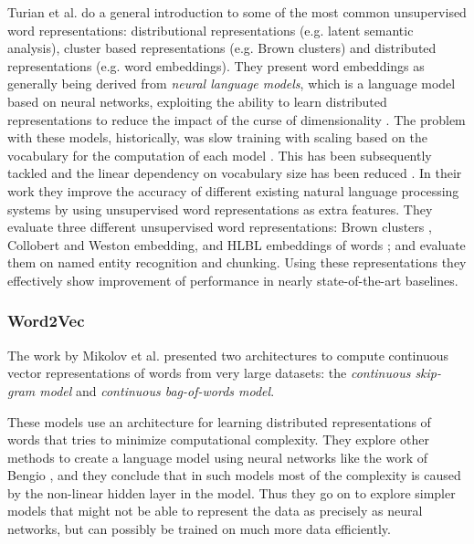 Turian et al. \cite{Turian:2010:WRS:1858681.1858721} do a general introduction
to some of the most common unsupervised word representations: distributional
representations (e.g. latent semantic analysis), cluster based representations
(e.g. Brown clusters) and distributed representations (e.g. word embeddings).
They present word embeddings as generally being derived from {\em neural
language models}, which is a language model based on neural networks,
exploiting the ability to learn distributed representations to reduce the
impact of the curse of dimensionality \cite{Bengio:2008}. The problem with
these models, historically, was slow training with scaling based on the
vocabulary for the computation of each model
\cite{Bengio:2003:NPL:944919.944966}. This has been subsequently tackled and
the linear dependency on vocabulary size has been reduced
\cite{Morin+al-2005,Collobert:2008:UAN:1390156.1390177,NIPS2008_3583}. In their
work they improve the accuracy of different existing natural language
processing systems by using unsupervised word representations as extra
features. They evaluate three different unsupervised word representations:
Brown clusters \cite{Brown:1992:CNG:176313.176316}, Collobert and Weston
\cite{Weston2008} embedding, and HLBL embeddings of words \cite{NIPS2008_3583};
and evaluate them on named entity recognition and chunking. Using these
representations they effectively show improvement of performance in nearly
state-of-the-art baselines.

\subsubsection{Word2Vec}

The work by Mikolov et al. \cite{Mikolov2013} presented two architectures
to compute continuous vector representations of words from very large datasets:
the {\em continuous skip-gram model} and {\em continuous bag-of-words model}.

These models use an architecture for learning distributed representations of
words that tries to minimize computational complexity. They explore other
methods to create a language model using neural networks like the work of
Bengio \cite{Bengio:2003:NPL:944919.944966}, and they conclude that in such
models most of the complexity is caused by the non-linear hidden layer in the
model.  Thus they go on to explore simpler models that might not be able to
represent the data as precisely as neural networks, but can possibly be trained
on much more data efficiently.

